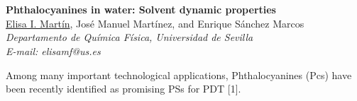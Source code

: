 \section*{}
\begin{center}
{\bf \Large
Phthalocyanines in water: Solvent dynamic properties
}
\\
\vspace{0.5cm}
\underline{Elisa I. Martín}, José Manuel Martínez, and Enrique Sánchez Marcos
\\
\vspace{0.5cm}
{\it
Departamento de Química Física, Universidad de Sevilla
}
\\
\vspace{0.5cm}
{\it E-mail: elisamf@us.es}
\\
\vspace{0.5cm}
\end{center}
Among many important technological applications, Phthalocyanines (Pcs) have been recently identified as promising PSs for PDT [1].

